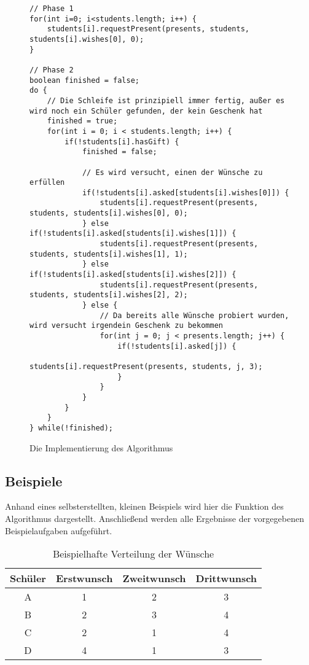 \documentclass[a4paper, 12pt]{scrartcl}
\begin{document}
\begin{figure}[h]
    \centering
\begin{lstlisting}
// Phase 1
for(int i=0; i<students.length; i++) {
    students[i].requestPresent(presents, students, students[i].wishes[0], 0);
}
            
// Phase 2
boolean finished = false;
do {
    // Die Schleife ist prinzipiell immer fertig, außer es wird noch ein Schüler gefunden, der kein Geschenk hat
    finished = true;
    for(int i = 0; i < students.length; i++) {
        if(!students[i].hasGift) {
            finished = false;
            			
            // Es wird versucht, einen der Wünsche zu erfüllen
            if(!students[i].asked[students[i].wishes[0]]) {
            	students[i].requestPresent(presents, students, students[i].wishes[0], 0);
            } else if(!students[i].asked[students[i].wishes[1]]) {
            	students[i].requestPresent(presents, students, students[i].wishes[1], 1);
            } else if(!students[i].asked[students[i].wishes[2]]) {
            	students[i].requestPresent(presents, students, students[i].wishes[2], 2);
            } else {
                // Da bereits alle Wünsche probiert wurden, wird versucht irgendein Geschenk zu bekommen
            	for(int j = 0; j < presents.length; j++) {
            	    if(!students[i].asked[j]) {
            	        students[i].requestPresent(presents, students, j, 3);
            	    }
                }
            }
        }
    }
} while(!finished);
    \end{lstlisting}
    \caption{Die Implementierung des Algorithmus\label{AlgWichteln}}
\end{figure}

\subsection{Beispiele}

Anhand eines selbsterstellten, kleinen Beispiels wird hier die Funktion des Algorithmus dargestellt. Anschließend werden alle Ergebnisse der vorgegebenen Beispielaufgaben aufgeführt.

\begin{table}[ht]
\centering

\begin{tabular}{@{}cccc@{}}
\toprule
Schüler & Erstwunsch & Zweitwunsch & Drittwunsch \\ \midrule
A       & 1          & 2           & 3           \\
B       & 2          & 3           & 4           \\
C       & 2          & 1           & 4           \\
D       & 4          & 1           & 3           \\ \bottomrule
\end{tabular}

\caption{Beispielhafte Verteilung der Wünsche\label{BeispielWichteln}}
\end{table}
\end{document}
